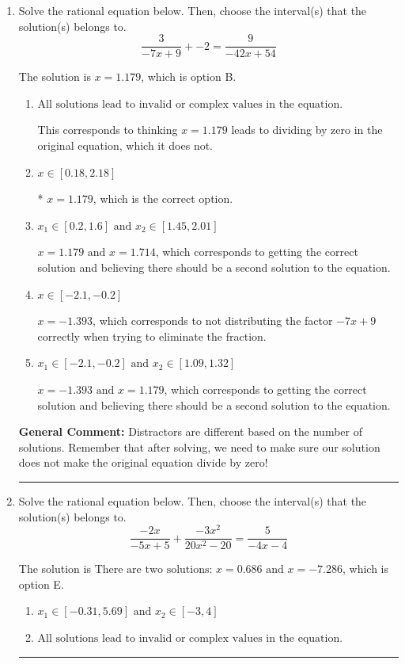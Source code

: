 \documentclass{extbook}[14pt]
\newcommand{\litem}[1]{\item #1

\rule{\textwidth}{0.4pt}}
\begin{document}
\begin{enumerate}\litem{
Solve the rational equation below. Then, choose the interval(s) that the solution(s) belongs to.
\[ \frac{3}{-7x + 9} + -2 = \frac{9}{-42x + 54} \]

The solution is \( x = 1.179 \), which is option B.\begin{enumerate}[label=\Alph*.]
\item \( \text{All solutions lead to invalid or complex values in the equation.} \)

This corresponds to thinking $x = 1.179$ leads to dividing by zero in the original equation, which it does not.
\item \( x \in [0.18,2.18] \)

* $x = 1.179$, which is the correct option.
\item \( x_1 \in [0.2, 1.6] \text{ and } x_2 \in [1.45,2.01] \)

$x = 1.179 \text{ and } x = 1.714$, which corresponds to getting the correct solution and believing there should be a second solution to the equation.
\item \( x \in [-2.1,-0.2] \)

$x = -1.393$, which corresponds to not distributing the factor $-7x + 9$ correctly when trying to eliminate the fraction.
\item \( x_1 \in [-2.1, -0.2] \text{ and } x_2 \in [1.09,1.32] \)

$x = -1.393 \text{ and } x = 1.179$, which corresponds to getting the correct solution and believing there should be a second solution to the equation.
\end{enumerate}

\textbf{General Comment:} Distractors are different based on the number of solutions. Remember that after solving, we need to make sure our solution does not make the original equation divide by zero!
}
\litem{
Solve the rational equation below. Then, choose the interval(s) that the solution(s) belongs to.
\[ \frac{-2x}{-5x + 5} + \frac{-3x^{2}}{20x^{2} -20} = \frac{5}{-4x -4} \]

The solution is \( \text{There are two solutions: } x = 0.686 \text{ and } x = -7.286 \), which is option E.\begin{enumerate}[label=\Alph*.]
\item \( x_1 \in [-0.31, 5.69] \text{ and } x_2 \in [-3,4] \)


\item \( \text{All solutions lead to invalid or complex values in the equation.} \)



\end{enumerate}}
\end{enumerate}
\end{document}
